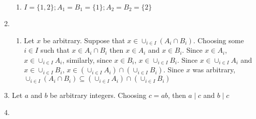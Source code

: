 \begin{enumerate}
\begin{enumerate}
        \item 
    $I=\{1,2\}; A_1 = B_1 = \{1\}; A_2 = B_2 = \{2\}$
    \end{enumerate}
    \item
    \begin{enumerate}
        \item 
    Let $x$ be arbitrary. Suppose that $x \in \cup_{i \in I}(A_i \cap B_i)$. Choosing some $i \in I$ such that $x \in A_i \cap B_i$ then $x \in A_i$ and $x \in B_i$. Since $x \in A_i$, $x \in \cup_{i \in I} A_i$, similarly, since $x \in B_i$, $x \in \cup_{i \in I} B_i$. Since $x \in \cup_{i \in I} A_i$ and $x \in \cup_{i \in I} B_i$, $x \in (\cup_{i \in I} A_i) \cap (\cup_{i \in I} B_i)$. Since $x$ was arbitrary, $\cup_{i \in I}(A_i \cap B_i) \subseteq (\cup_{i \in I} A_i) \cap (\cup_{i \in I} B_i)$
    \end{enumerate}
    \item
    Let $a$ and $b$ be arbitrary integers. Choosing $c = ab$, then $a \mid c$ and $b \mid c$
    \item
\end{enumerate}

